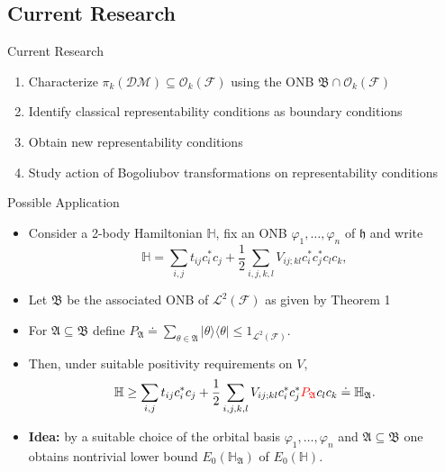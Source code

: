 \documentclass{beamer}
\newcommand{\HS}{{\mathcal{L}^2(\FockSpace)}}
\newcommand{\HSbasis}{\mathfrak{B}}
\newcommand{\HilbertSpace}{\ensuremath{\mathfrak{h}}}
\newcommand{\FockSpace}{\mathcal{F}}
\newcommand{\Hamiltonian}{\mathbb{H}}
\newcommand{\DensityMatrices}{\mathcal{DM}}
\newcommand{\kbOp}[1][k]{{\ensuremath{\mathcal{O}_{#1}(\mathcal{F})}}}
\begin{document}
\subsection{Current Research}
\begin{frame}{Current Research}
    \begin{enumerate}
        \item Characterize $\pi_k(\DensityMatrices)\subseteq\kbOp$ using the ONB $\HSbasis\cap\kbOp$
        \item Identify classical representability conditions as boundary conditions
        \item Obtain new representability conditions
        \item Study action of Bogoliubov transformations on representability conditions
    \end{enumerate}
\end{frame}

\begin{frame}{Possible Application}
    \begin{itemize}
        \item Consider a 2-body Hamiltonian $\Hamiltonian$, fix an ONB
        $\varphi_1,\dots,\varphi_n$ of $\HilbertSpace$ and write
        \begin{equation}
            \Hamiltonian=\sum_{i,j}t_{ij}c_i^*c_j+\frac{1}{2}\sum_{i,j,k,l}V_{ij;kl}c_i^*c_j^*c_lc_k,
        \end{equation}
        \item Let $\mathfrak{B}$ be the associated ONB of $\HS$ as given by Theorem 1
        \item For $\mathfrak{A}\subseteq\mathfrak{B}$ define
        $P_{\mathfrak{A}}\doteq\sum_{\theta\in\mathfrak{A}}\left|\theta\rangle\langle\theta\right|\le
        1_\HS$.
        \item Then, under suitable positivity requirements on $V$,
        \begin{equation}
            \Hamiltonian\ge\sum_{i,j}t_{ij}c_i^*c_j+
            \frac{1}{2}\sum_{i,j,k,l}V_{ij;kl}c_i^*c_j^*\textcolor{red}{P_\mathfrak{A}}c_lc_k
            \doteq\Hamiltonian_\mathfrak{A}.
        \end{equation}
        \item \textbf{Idea:} by a suitable choice
        of the orbital basis $\varphi_1,\ldots,\varphi_n$ and $\mathfrak{A}\subseteq\mathfrak{B}$
        one obtains nontrivial lower bound $E_0(\Hamiltonian_\mathfrak{A})$ of $E_0(\Hamiltonian)$.
    \end{itemize}
\end{frame}
\end{document}
